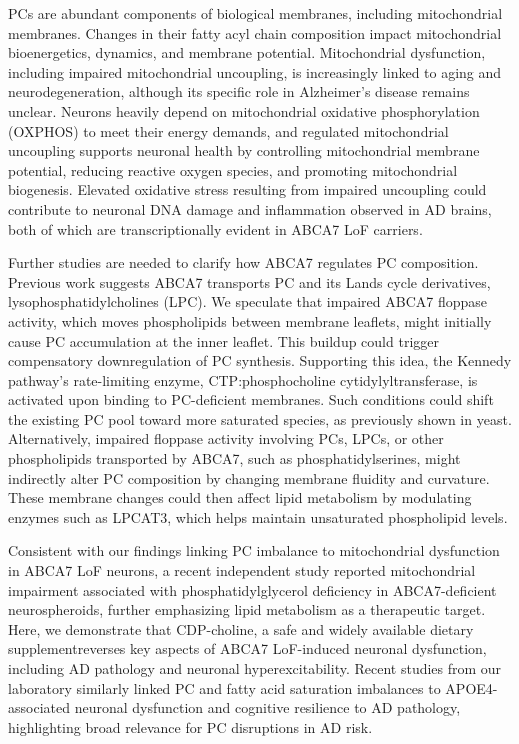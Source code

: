 PCs are abundant components of biological membranes, including mitochondrial membranes. Changes in their fatty acyl chain composition impact mitochondrial bioenergetics, dynamics, and membrane potential\supercite{Decker2024-ae}. Mitochondrial dysfunction, including impaired mitochondrial uncoupling, is increasingly linked to aging and neurodegeneration, although its specific role in Alzheimer's disease remains unclear\supercite{Crivelli2024-pf}. Neurons heavily depend on mitochondrial oxidative phosphorylation (OXPHOS) to meet their energy demands\supercite{Morant-Ferrando2023-va}, and regulated mitochondrial uncoupling supports neuronal health by controlling mitochondrial membrane potential, reducing reactive oxygen species, and promoting mitochondrial biogenesis\supercite{Korshunov1997-aj,Andrews2005-yy}. Elevated oxidative stress resulting from impaired uncoupling could contribute to neuronal DNA damage and inflammation observed in AD brains\supercite{Welch2022-bp}, both of which are transcriptionally evident in ABCA7 LoF carriers.

Further studies are needed to clarify how ABCA7 regulates PC composition. Previous work suggests ABCA7 transports PC and its Lands cycle derivatives, lysophosphatidylcholines (LPC)\supercite{Tomioka2017-sq}. We speculate that impaired ABCA7 floppase activity, which moves phospholipids between membrane leaflets, might initially cause PC accumulation at the inner leaflet. This buildup could trigger compensatory downregulation of PC synthesis. Supporting this idea, the Kennedy pathway’s rate-limiting enzyme, CTP:phosphocholine cytidylyltransferase, is activated upon binding to PC-deficient membranes\supercite{Cornell2016-zk}. Such conditions could shift the existing PC pool toward more saturated species, as previously shown in yeast\supercite{Boumann2006-nz}. Alternatively, impaired floppase activity involving PCs, LPCs, or other phospholipids transported by ABCA7, such as phosphatidylserines\supercite{Fang2025}, might indirectly alter PC composition by changing membrane fluidity and curvature\supercite{Takada2018-ce}. These membrane changes could then affect lipid metabolism by modulating enzymes such as LPCAT3, which helps maintain unsaturated phospholipid levels\supercite{Ballweg2020-rv,Ariyama2010-cc}.

Consistent with our findings linking PC imbalance to mitochondrial dysfunction in ABCA7 LoF neurons, a recent independent study reported mitochondrial impairment associated with phosphatidylglycerol deficiency in ABCA7-deficient neurospheroids\supercite{Kawatani2023-vf}, further emphasizing lipid metabolism as a therapeutic target. Here, we demonstrate that CDP-choline, a safe and widely available dietary supplement\supercite{Gavrilova2018-oi}reverses key aspects of ABCA7 LoF-induced neuronal dysfunction, including AD pathology and neuronal hyperexcitability. Recent studies from our laboratory similarly linked PC and fatty acid saturation imbalances to APOE4-associated neuronal dysfunction\supercite{Sienski2021-zt} and cognitive resilience to AD pathology\supercite{Mathys2024-ex}, highlighting broad relevance for PC disruptions in AD risk.

